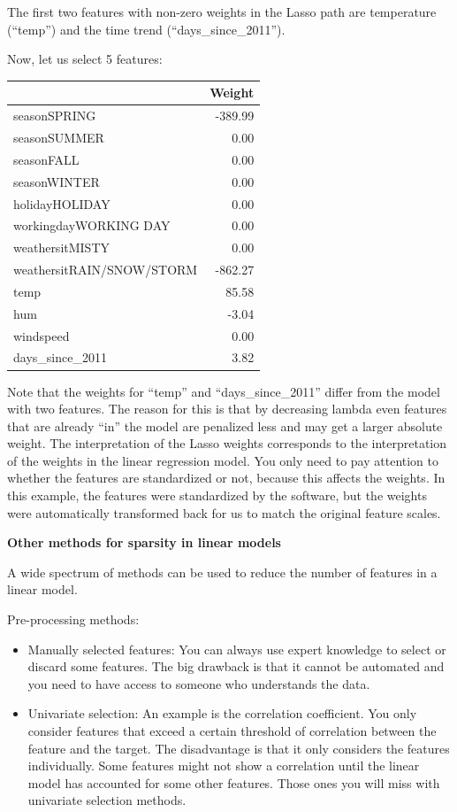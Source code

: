\documentclass[12pt,]{krantz}
\providecommand{\tightlist}{%
  \setlength{\itemsep}{0pt}\setlength{\parskip}{0pt}}
\begin{document}
The first two features with non-zero weights in the Lasso path are
temperature (``temp'') and the time trend (``days\_since\_2011'').

Now, let us select 5 features:

\begin{tabular}{l|r}
\hline
  & Weight\\
\hline
seasonSPRING & -389.99\\
\hline
seasonSUMMER & 0.00\\
\hline
seasonFALL & 0.00\\
\hline
seasonWINTER & 0.00\\
\hline
holidayHOLIDAY & 0.00\\
\hline
workingdayWORKING DAY & 0.00\\
\hline
weathersitMISTY & 0.00\\
\hline
weathersitRAIN/SNOW/STORM & -862.27\\
\hline
temp & 85.58\\
\hline
hum & -3.04\\
\hline
windspeed & 0.00\\
\hline
days\_since\_2011 & 3.82\\
\hline
\end{tabular}

Note that the weights for ``temp'' and ``days\_since\_2011'' differ from
the model with two features. The reason for this is that by decreasing
lambda even features that are already ``in'' the model are penalized
less and may get a larger absolute weight. The interpretation of the
Lasso weights corresponds to the interpretation of the weights in the
linear regression model. You only need to pay attention to whether the
features are standardized or not, because this affects the weights. In
this example, the features were standardized by the software, but the
weights were automatically transformed back for us to match the original
feature scales.

\textbf{Other methods for sparsity in linear models}

A wide spectrum of methods can be used to reduce the number of features
in a linear model.

Pre-processing methods:

\begin{itemize}
\tightlist
\item
  Manually selected features: You can always use expert knowledge to
  select or discard some features. The big drawback is that it cannot be
  automated and you need to have access to someone who understands the
  data.
\item
  Univariate selection: An example is the correlation coefficient. You
  only consider features that exceed a certain threshold of correlation
  between the feature and the target. The disadvantage is that it only
  considers the features individually. Some features might not show a
  correlation until the linear model has accounted for some other
  features. Those ones you will miss with univariate selection methods.
\end{itemize}
\end{document}
